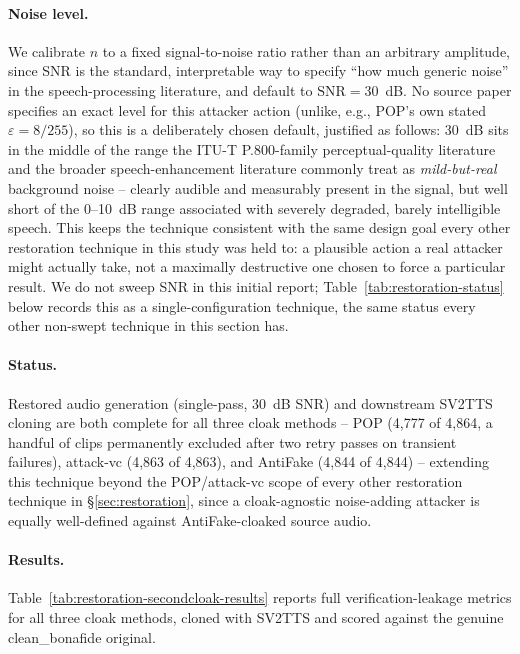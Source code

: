 \documentclass[11pt]{article}
\begin{document}
\paragraph{Noise level.} We calibrate $n$ to a fixed signal-to-noise
ratio rather than an arbitrary amplitude, since SNR is the standard,
interpretable way to specify ``how much generic noise'' in the
speech-processing literature, and default to $\mathrm{SNR}=30$~dB. No
source paper specifies an exact level for this attacker action (unlike,
e.g., POP's own stated $\varepsilon=8/255$), so this is a deliberately
chosen default, justified as follows: 30~dB sits in the middle of the
range the ITU-T P.800-family perceptual-quality literature and the
broader speech-enhancement literature commonly treat as
\emph{mild-but-real} background noise -- clearly audible and measurably
present in the signal, but well short of the 0--10~dB range associated
with severely degraded, barely intelligible speech. This keeps the
technique consistent with the same design goal every other restoration
technique in this study was held to: a plausible action a real
attacker might actually take, not a maximally destructive one chosen to
force a particular result. We do not sweep SNR in this initial report;
Table~\ref{tab:restoration-status} below records this as a single-configuration
technique, the same status every other non-swept technique in this
section has.

\paragraph{Status.} Restored audio generation (single-pass, 30~dB SNR)
and downstream SV2TTS cloning are both complete for all three cloak
methods -- POP (4,777 of 4,864, a handful of clips permanently excluded
after two retry passes on transient failures), attack-vc (4,863 of
4,863), and AntiFake (4,844 of 4,844) -- extending this technique
beyond the POP/attack-vc scope of every other restoration technique in
\S\ref{sec:restoration}, since a cloak-agnostic noise-adding attacker
is equally well-defined against AntiFake-cloaked source audio.

\paragraph{Results.} Table~\ref{tab:restoration-secondcloak-results}
reports full verification-leakage metrics for all three cloak methods,
cloned with SV2TTS and scored against the genuine clean\_bonafide
original.
\end{document}
